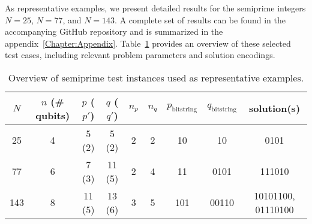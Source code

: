 As representative examples, we present detailed results for the semiprime integers $N = 25$, $N = 77$,
and $N = 143$. A complete set of results can be found in the accompanying GitHub repository
and is summarized in the appendix~\ref{Chapter:Appendix}. Table~\ref{tab:instances_overview} provides an overview of
these selected test cases, including relevant problem parameters and solution encodings.
\begin{table}[h]
    \centering
    \begin{tabular}{@{}ccccccccc@{}}
        \toprule
        $N$ & $n$ (\# qubits) & $p$ ($p'$) & $q$ ($q'$) & $n_p$ & $n_q$ & $p_\mathrm{bitstring}$ & $q_\mathrm{bitstring}$ & solution(s) \\
        \midrule
        25  & 4          & 5 (2)      & 5 (2)      & 2     & 2     & 10                     & 10                     & 0101                  \\
        77  & 6          & 7 (3)      & 11 (5)     & 2     & 4     & 11                     & 0101                   & 111010                \\
        143 & 8          & 11 (5)     & 13 (6)     & 3     & 5     & 101                    & 00110                  & 10101100, 01110100    \\
        \bottomrule
    \end{tabular}
    \caption{Overview of semiprime test instances used as representative examples.}
    \label{tab:instances_overview}
\end{table}


